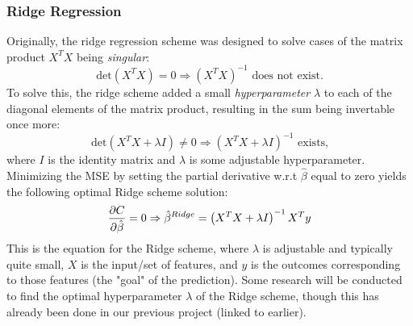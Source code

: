         \subsubsection{Ridge Regression}
            Originally, the ridge regression scheme was designed to solve cases of the matrix product $X^TX$ being \textit{singular}:
            \begin{equation}
                \text{det} \left(X^TX \right) = 0 \Rightarrow \left( X^TX \right)^{-1} \text{ does not exist.}
            \end{equation}
            To solve this, the ridge scheme added a small \textit{hyperparameter} $\lambda$ to each of the diagonal elements of the matrix product, resulting in the sum being invertable once more:
            \begin{equation}
                \text{det} \left(X^TX +\lambda I \right) \neq 0 \Rightarrow \left(X^TX +\lambda I \right)^{-1} \text{ exists,}
            \end{equation}
            where $I$ is the identity matrix and $\lambda$ is some adjustable hyperparameter. Minimizing the MSE by setting the partial derivative w.r.t $\hat{\beta}$ equal to zero yields the following optimal Ridge scheme solution:
            \begin{equation}
                \pdv{C}{\hat{\beta}}=0\Rightarrow \hat{\beta}^{Ridge} = \left( X^TX + \lambda I \right)^{-1}X^Ty
            \end{equation}
            This is the equation for the Ridge scheme, where $\lambda$ is adjustable and typically quite small, $X$ is the input/set of features, and $y$ is the outcomes corresponding to those features (the "goal" of the prediction). Some research will be conducted to find the optimal hyperparameter $\lambda$ of the Ridge scheme, though this has already been done in our previous project (linked to earlier).
            
